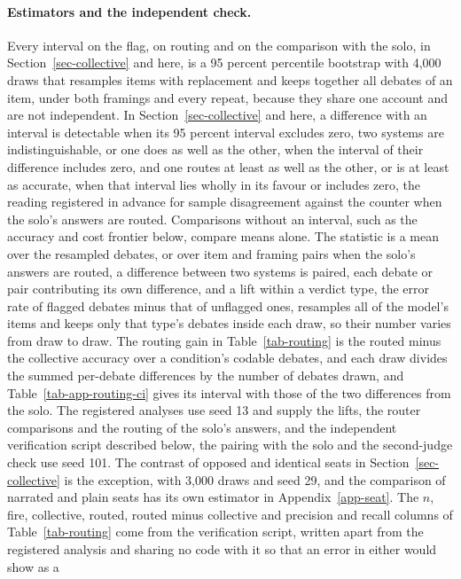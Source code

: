 \paragraph{Estimators and the independent check.}
Every interval on the flag, on routing and on the comparison with the solo,
in Section~\ref{sec-collective} and here, is a 95 percent percentile bootstrap
with 4,000 draws that resamples items with replacement and keeps together all
debates of an item, under both framings and every repeat, because they share
one account and are not independent. In Section~\ref{sec-collective} and
here, a difference with an interval is detectable when its 95 percent
interval excludes zero, two systems are indistinguishable, or one does as
well as the other, when the interval of their difference includes zero, and
one routes at least as well as the other, or is at least as accurate, when
that interval lies wholly in its favour or includes zero, the reading
registered in advance for sample disagreement against the counter when the
solo's answers are routed. Comparisons without an interval, such as the
accuracy and cost frontier below, compare means alone.
The statistic is a mean over the
resampled debates, or over item and framing pairs when the solo's answers are
routed, a difference between two systems is paired, each debate or pair
contributing its own difference, and a lift within a verdict type, the error
rate of flagged debates minus that of unflagged ones, resamples all of the
model's items and keeps only that type's debates inside each draw, so their
number varies from draw to draw. The routing gain in Table~\ref{tab-routing}
is the routed minus the collective accuracy over a condition's codable
debates, and each draw divides the summed per-debate differences by the
number of debates drawn, and Table~\ref{tab-app-routing-ci} gives its interval
with those of the two differences from the solo. The registered analyses use seed 13 and
supply the lifts, the router comparisons and the routing of the solo's
answers, and the independent verification script described below, the
pairing with the solo and the second-judge check use seed 101. The contrast of opposed and identical seats
in Section~\ref{sec-collective} is the exception, with 3,000 draws and seed
29, and the comparison of narrated and plain seats has its own estimator in
Appendix~\ref{app-seat}. The $n$, fire, collective, routed, routed minus
collective and precision and recall columns of Table~\ref{tab-routing} come
from the verification script, written apart from the registered analysis and
sharing no code with it so that an error in either would show as a
